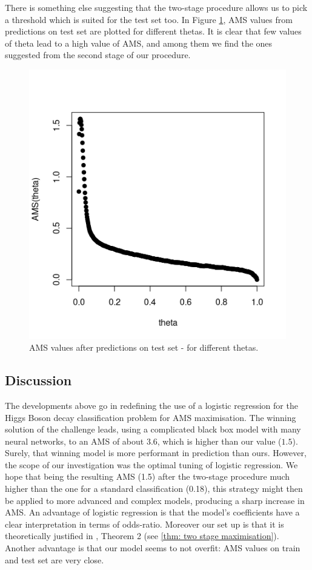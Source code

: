 \documentclass[]{article}
\begin{document}
There is something else suggesting that the two-stage procedure allows us to pick a threshold which is suited for the test set too. In Figure \ref{fig: AMS on test}, AMS values from predictions on test set are plotted for different thetas. It is clear that few values of theta lead to a high value of AMS, and among them we find the ones suggested from the second stage of our procedure. 

\begin{figure}[H]
\centering
\includegraphics[scale=0.7]{../Pictures/testbadpractice.png}
\caption{AMS values after predictions on test set - for different thetas.}
\label{fig: AMS on test}
\end{figure}

\subsection{Discussion}

The developments above go in redefining the use of a logistic regression for the Higgs Boson decay classification problem for AMS maximisation. The winning solution of the challenge leads, using a complicated black box model with many neural networks, to an AMS of about $3.6$, which is higher than our value ($1.5$). Surely, that winning model is more performant in prediction than ours. However, the scope of our investigation was the optimal tuning of logistic regression. We hope that being the resulting AMS (1.5) after the two-stage procedure much higher than the one for a standard classification (0.18), this strategy might then be applied to more advanced and complex models, producing a sharp increase in AMS. An advantage of logistic regression is that the model's coefficients have a clear interpretation in terms of odds-ratio. Moreover our set up is that it is theoretically justified in \cite{kotlowski2014consistent}, Theorem 2 (see \ref{thm: two stage maximisation}). Another advantage is that our model seems to not overfit: AMS values on train and test set are very close.





\end{document}
